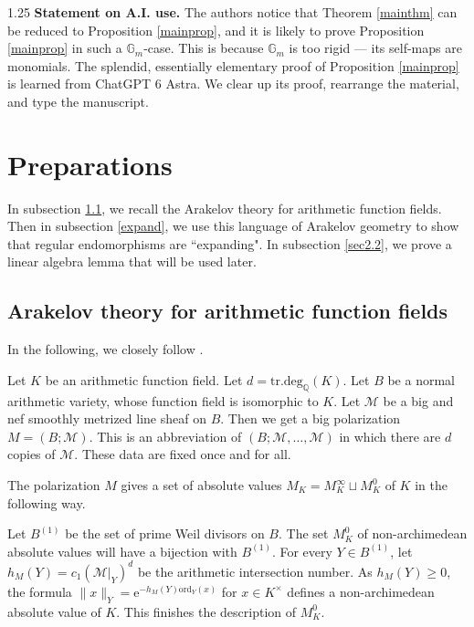 \documentclass[12pt]{article}
\begin{document}
\begin{spacing}{1.25}
\textbf{Statement on A.I. use.} The authors notice that Theorem \ref{mainthm} can be reduced to Proposition \ref{mainprop}, and it is likely to prove Proposition \ref{mainprop} in such a $\mathbb{G}_m$-case. This is because $\mathbb{G}_m$ is too rigid --- its self-maps are monomials. The splendid, essentially elementary proof of Proposition \ref{mainprop} is learned from ChatGPT 6 Astra. We clear up its proof, rearrange the material, and type the manuscript.















\section{Preparations}\label{Sec2}

In subsection \ref{sec2.1}, we recall the Arakelov theory for arithmetic function fields. Then in subsection \ref{expand}, we use this language of Arakelov geometry to show that regular endomorphisms are ``expanding". In subsection \ref{sec2.2}, we prove a linear algebra lemma that will be used later.


\subsection{Arakelov theory for arithmetic function fields}\label{sec2.1}

In the following, we closely follow \cite[Subsections 3A--3C]{Voj21}.

Let $K$ be an arithmetic function field. Let $d=\mathrm{tr.deg}_{\mathbb{Q}}(K)$. Let $B$ be a normal arithmetic variety, whose function field is isomorphic to $K$. Let $\mathcal{M}$ be a big and nef smoothly metrized line sheaf on $B$. Then we get a big polarization $M=(B;\mathcal{M})$. This is an abbreviation of $(B;\mathcal{M},\dots,\mathcal{M})$ in which there are $d$ copies of $\mathcal{M}$. These data are fixed once and for all.

The polarization $M$ gives a set of absolute values $M_{K}=M_{K}^{\infty}\sqcup M_{K}^{0}$ of $K$ in the following way.

Let $B^{(1)}$ be the set of prime Weil divisors on $B$. The set $M_{K}^{0}$ of non-archimedean absolute values will have a bijection with $B^{(1)}$. For every $Y\in B^{(1)}$, let $h_M(Y)=c_1(\mathcal{M}|_{Y})^d$ be the arithmetic intersection number. As $h_M(Y)\geq0$, the formula $\|x\|_Y=\mathrm{e}^{-h_M(Y)\mathrm{ord}_Y(x)}$ for $x\in K^{\times}$ defines a non-archimedean absolute value of $K$. This finishes the description of $M_K^{0}$.


\end{spacing}
\end{document}

